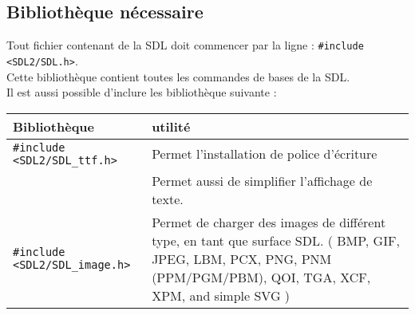 \documentclass[ 10pt , a4paper ]{Document}
\begin{document}
\begin{Document}
\section{Bibliothèque nécessaire}
	Tout fichier contenant de la SDL doit commencer par la ligne :
	\lstinline!#include <SDL2/SDL.h>!.\\
	Cette bibliothèque contient toutes les commandes de bases de la SDL.\\

	Il est aussi possible d'inclure les bibliothèque suivante :\\
	\begin{tabular}{|l@{$\Rightarrow$}p{10cm}|}\hline
		Bibliothèque & utilité\\
		\hline
		\lstinline!#include <SDL2/SDL_ttf.h>!
			& Permet l'installation de police d'écriture\\
			& Permet aussi de simplifier l'affichage de texte.\\
		\lstinline!#include <SDL2/SDL_image.h>!
			& Permet de charger des images de différent type, en tant que surface SDL.
			( BMP, GIF, JPEG, LBM, PCX, PNG, PNM (PPM/PGM/PBM), QOI, TGA, XCF, XPM, and simple SVG )\\
		\hline
	\end{tabular}

\end{Document}
\end{document}
